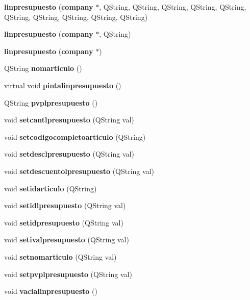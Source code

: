 \begin{CompactItemize}
\item 
{\bf linpresupuesto} ({\bf company} $\ast$, QString, QString, QString, QString, QString, QString, QString, QString, QString, QString)
\item 
{\bf linpresupuesto} ({\bf company} $\ast$, QString)\label{classlinpresupuesto_a13}

\item 
{\bf linpresupuesto} ({\bf company} $\ast$)\label{classlinpresupuesto_a14}

\item 
QString {\bf nomarticulo} ()\label{classlinpresupuesto_a15}

\item 
virtual void {\bf pintalinpresupuesto} ()\label{classlinpresupuesto_a16}

\item 
QString {\bf pvplpresupuesto} ()\label{classlinpresupuesto_a17}

\item 
void {\bf setcantlpresupuesto} (QString val)\label{classlinpresupuesto_a18}

\item 
void {\bf setcodigocompletoarticulo} (QString)\label{classlinpresupuesto_a19}

\item 
void {\bf setdesclpresupuesto} (QString val)\label{classlinpresupuesto_a20}

\item 
void {\bf setdescuentolpresupuesto} (QString val)\label{classlinpresupuesto_a21}

\item 
void {\bf setidarticulo} (QString)
\item 
void {\bf setidlpresupuesto} (QString val)\label{classlinpresupuesto_a23}

\item 
void {\bf setidpresupuesto} (QString val)\label{classlinpresupuesto_a24}

\item 
void {\bf setivalpresupuesto} (QString val)\label{classlinpresupuesto_a25}

\item 
void {\bf setnomarticulo} (QString val)\label{classlinpresupuesto_a26}

\item 
void {\bf setpvplpresupuesto} (QString val)\label{classlinpresupuesto_a27}

\item 
void {\bf vacialinpresupuesto} ()\label{classlinpresupuesto_a28}

\end{CompactItemize}


